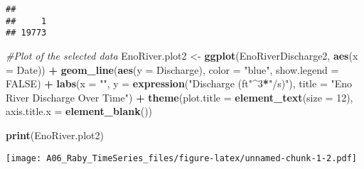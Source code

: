 \documentclass[]{article}
\newenvironment{Shaded}{\begin{snugshade}}{\end{snugshade}}
\newcommand{\CommentTok}[1]{\textcolor[rgb]{0.56,0.35,0.01}{\textit{#1}}}
\newcommand{\DataTypeTok}[1]{\textcolor[rgb]{0.13,0.29,0.53}{#1}}
\newcommand{\DecValTok}[1]{\textcolor[rgb]{0.00,0.00,0.81}{#1}}
\newcommand{\KeywordTok}[1]{\textcolor[rgb]{0.13,0.29,0.53}{\textbf{#1}}}
\newcommand{\NormalTok}[1]{#1}
\newcommand{\OperatorTok}[1]{\textcolor[rgb]{0.81,0.36,0.00}{\textbf{#1}}}
\newcommand{\OtherTok}[1]{\textcolor[rgb]{0.56,0.35,0.01}{#1}}
\newcommand{\StringTok}[1]{\textcolor[rgb]{0.31,0.60,0.02}{#1}}
\begin{document}
\begin{verbatim}
## 
##     1 
## 19773
\end{verbatim}

\begin{Shaded}
\begin{Highlighting}[]
\CommentTok{#Plot of the selected data}
\NormalTok{EnoRiver.plot2 <-}\StringTok{ }\KeywordTok{ggplot}\NormalTok{(EnoRiverDischarge2, }\KeywordTok{aes}\NormalTok{(}\DataTypeTok{x =}\NormalTok{ Date)) }\OperatorTok{+}
\StringTok{  }\KeywordTok{geom_line}\NormalTok{(}\KeywordTok{aes}\NormalTok{(}\DataTypeTok{y =}\NormalTok{ Discharge), }\DataTypeTok{color =} \StringTok{"blue"}\NormalTok{, }\DataTypeTok{show.legend =} \OtherTok{FALSE}\NormalTok{) }\OperatorTok{+}
\StringTok{  }\KeywordTok{labs}\NormalTok{(}\DataTypeTok{x =} \StringTok{""}\NormalTok{, }\DataTypeTok{y =} \KeywordTok{expression}\NormalTok{(}\StringTok{"Discharge (ft"}\OperatorTok{^}\DecValTok{3}\OperatorTok{*}\StringTok{"/s)"}\NormalTok{), }
       \DataTypeTok{title =} \StringTok{"Eno River Discharge Over Time"}\NormalTok{) }\OperatorTok{+}
\StringTok{  }\KeywordTok{theme}\NormalTok{(}\DataTypeTok{plot.title =} \KeywordTok{element_text}\NormalTok{(}\DataTypeTok{size =} \DecValTok{12}\NormalTok{),}
        \DataTypeTok{axis.title.x =} \KeywordTok{element_blank}\NormalTok{())}

\KeywordTok{print}\NormalTok{(EnoRiver.plot2)}
\end{Highlighting}
\end{Shaded}

\texttt{[image: A06\_Raby\_TimeSeries\_files/figure-latex/unnamed-chunk-1-2.pdf]}
\end{document}
